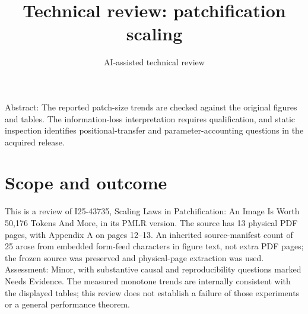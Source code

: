 \documentclass[10pt]{article}
\title{Technical review: patchification scaling}
\author{AI-assisted technical review}
\date{}
\begin{document}
\maketitle
Abstract: The reported patch-size trends are checked against the original figures and tables. The information-loss interpretation requires qualification, and static inspection identifies positional-transfer and parameter-accounting questions in the acquired release.\par
\section*{Scope and outcome}
This is a review of I25-43735, Scaling Laws in Patchification: An Image Is Worth 50,176 Tokens And More, in its PMLR version. The source has 13 physical PDF pages, with Appendix A on pages 12–13. An inherited source-manifest count of 25 arose from embedded form-feed characters in figure text, not extra PDF pages; the frozen source was preserved and physical-page extraction was used. Assessment: Minor, with substantive causal and reproducibility questions marked Needs Evidence. The measured monotone trends are internally consistent with the displayed tables; this review does not establish a failure of those experiments or a general performance theorem.\par
\end{document}

